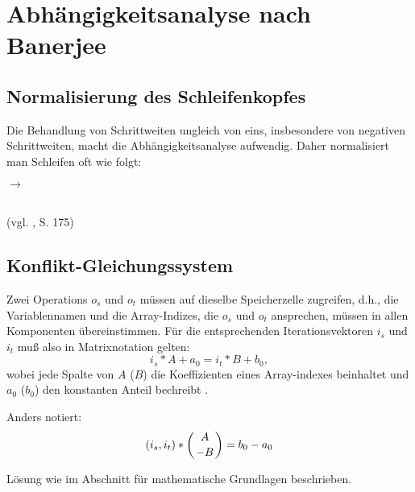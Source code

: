 \section{Abhängigkeitsanalyse nach Banerjee}


\subsection{Normalisierung des Schleifenkopfes}
Die Behandlung von Schrittweiten ungleich von eins, insbesondere von
negativen Schrittweiten, macht die Abhängigkeitsanalyse aufwendig. Daher
normalisiert man Schleifen oft wie folgt:



\begin{minipage}{.4\textwidth}
  \begin{algorithm}[H]
  \end{algorithm}
\end{minipage}
\begin{minipage}{.5\textwidth}
    \qquad $\to$ \qquad
    \begin{algorithm}[H]
      \end{algorithm}
\end{minipage}
  ~\\
(vgl. \cite{Zima90}, S. 175)


\subsection{Konflikt-Gleichungssystem}
Zwei Operations $o_s$ und $o_t$ müssen auf dieselbe Speicherzelle
zugreifen, d.h., die Variablennamen und die Array-Indizes, die $o_s$ und
$o_t$ ansprechen, müssen in allen Komponenten übereinstimmen. Für die
entsprechenden Iterationsvektoren $i_s$ und $i_t$ muß also in
Matrixnotation gelten:
$$i_s * A + a_0 = i_t * B + b_0,$$ wobei jede Spalte von $A$ ($B$) die
Koeffizienten eines Array-indexes beinhaltet und $a_0$ ($b_0$) den
konstanten Anteil bechreibt \cite{Ban93}.

Anders notiert: $$(i_s, i_t) * \left( {A \atop -B} \right) = b_0-a_0$$

Lösung wie im Abschnitt für mathematische Grundlagen
beschrieben.


